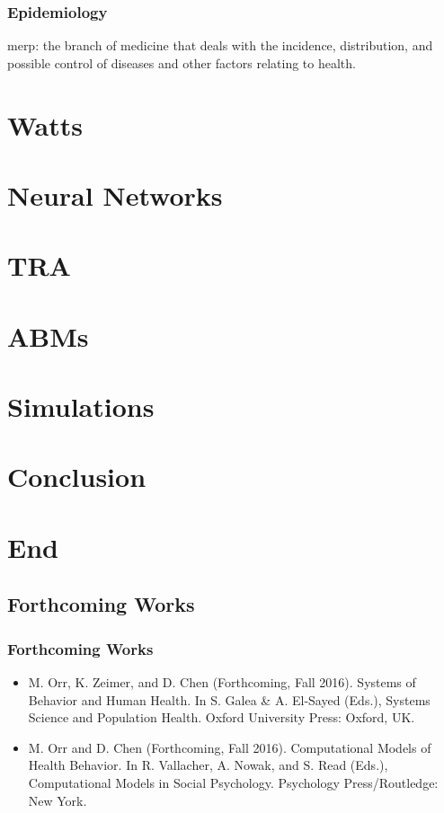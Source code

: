 \documentclass[compress]{beamer}
\begin{document}
\begin{frame}[Basic2] \frametitle{Epidemiology}
	merp: the branch of medicine that deals with the incidence, distribution, and possible control of diseases and other factors relating to health.
\end{frame}

\section{Watts}

\section{Neural Networks}

\section{TRA}

\section{ABMs}

\section{Simulations}

\section{Conclusion}

\section{End}

\subsection{Forthcoming Works}
	\begin{frame}[Basic2] \frametitle{Forthcoming Works}
		\begin{itemize}
			\item M. Orr, K. Zeimer, and D. Chen (Forthcoming, Fall 2016). Systems of Behavior and Human Health. In S. Galea \& A. El-Sayed (Eds.), Systems Science and Population Health. Oxford University Press: Oxford, UK.

			\item M. Orr and D. Chen (Forthcoming, Fall 2016). Computational Models of Health Behavior. In R. Vallacher, A. Nowak, and S. Read (Eds.), Computational Models in Social Psychology. Psychology Press/Routledge: New York.
		\end{itemize}
	\end{frame}
\end{document}
